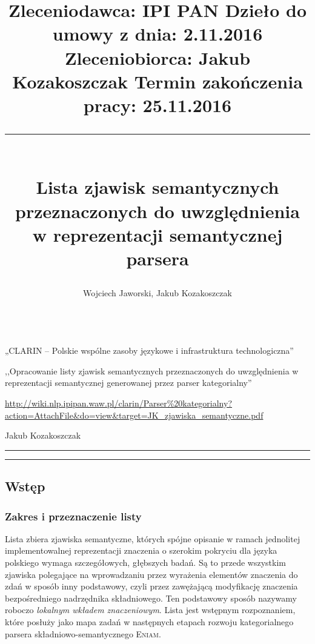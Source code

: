 \documentclass[a4paper, 12pt]{article}
\title{
\normalsize
\setlength{\topsep}{0pt} 
\noindent
Zleceniodawca: IPI PAN \hfill Dzieło do umowy z dnia: 2.11.2016 \\
Zleceniobiorca: Jakub Kozakoszczak \hfill Termin zakończenia pracy: 25.11.2016 \\
\rule{\linewidth}{2pt} \\[6pt] 
\huge Lista zjawisk semantycznych \\ przeznaczonych do uwzględnienia \\ w reprezentacji semantycznej parsera \eniam  \\[-2pt]}
\author{\Large Wojciech Jaworski, Jakub Kozakoszczak\\[6pt]
\hspace{-5pt}\rule{\linewidth}{2pt}  }
\date{}
\theoremstyle{remark}
\newcommand{\eniam}{\textsc{Eniam}}
\begin{document}
\maketitle
		
\vspace{-26pt}
\begin{description}
\setlength{\itemsep}{4pt} 
\setlength{\parskip}{0pt} 
	\item[Zrealizowane w ramach projektu:] „CLARIN -- Polskie wspólne zasoby językowe i infrastruktura technologiczna”
	\item[Tytuł pracy zamówionej:] ,,Opracowanie listy zjawisk semantycznych przeznaczonych do uwzględnienia w reprezentacji semantycznej generowanej przez parser kategorialny''
	\item[Adres dzieła:] \url{http://wiki.nlp.ipipan.waw.pl/clarin/Parser\%20kategorialny?action=AttachFile\&do=view\&target=JK_zjawiska_semantyczne.pdf}
	\item[Opracowanie dokumentu:] Jakub Kozakoszczak
\end{description}

\vspace{6pt}
\hrule
\vspace{-14pt}
\renewcommand\contentsname{\normalsize{}}
\tableofcontents
\vspace{20pt}
\hrule
\newpage

\subsection{Wstęp} %
{
\renewcommand\thesubsection{}
\renewcommand\thesubsubsection{}
\setcounter{subsection}{-1}
\subsubsection{Zakres i przeznaczenie listy} %
}
Lista zbiera zjawiska semantyczne, których spójne opisanie w ramach jednolitej implementowalnej reprezentacji znaczenia o szerokim pokryciu dla języka polskiego wymaga szczegółowych, głębszych badań.
Są to przede wszystkim zjawiska polegające na wprowadzaniu przez wyrażenia elementów znaczenia do zdań w sposób inny podstawowy, czyli przez zawężającą modyfikację znaczenia bezpośredniego nadrzędnika składniowego.
Ten podstawowy sposób nazywamy roboczo \emph{lokalnym wkładem znaczeniowym}.
Lista jest wstępnym rozpoznaniem, które posłuży jako mapa zadań w następnych etapach rozwoju kategorialnego parsera składniowo-semantycznego \eniam.

\end{document}
